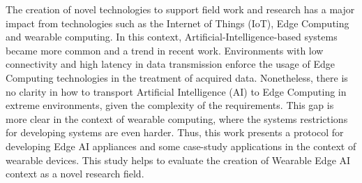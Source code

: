 \begin{foreignabstract}

The creation of novel technologies to support field work and research has a major impact from technologies such as the Internet of Things (IoT), Edge Computing and wearable computing. In this context, Artificial-Intelligence-based systems became more common and a trend in recent work. Environments with low connectivity and high latency in data transmission enforce the usage of Edge Computing technologies in the treatment of acquired data. Nonetheless, there is no clarity in how to transport Artificial Intelligence (AI) to Edge Computing in extreme environments, given the complexity of the requirements. This gap is more clear in the context of wearable computing, where the systems restrictions for developing systems are even harder. Thus, this work presents a protocol for developing Edge AI appliances and some case-study applications in the context of wearable devices. This study helps to evaluate the creation of Wearable Edge AI context as a novel research field.

\end{foreignabstract}